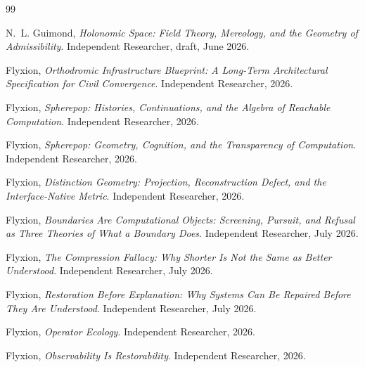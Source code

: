 \documentclass[11pt,fleqn]{book}
\numberwithin{equation}{chapter}
\theoremstyle{plain}
\theoremstyle{definition}
\theoremstyle{remark}
\begin{document}
\begin{thebibliography}{99}


N.~L. Guimond, \emph{Holonomic Space: Field Theory, Mereology, and the Geometry of Admissibility}. Independent Researcher, draft, June 2026.

Flyxion, \emph{Orthodromic Infrastructure Blueprint: A Long-Term Architectural Specification for Civil Convergence}. Independent Researcher, 2026.

Flyxion, \emph{Spherepop: Histories, Continuations, and the Algebra of Reachable Computation}. Independent Researcher, 2026.

Flyxion, \emph{Spherepop: Geometry, Cognition, and the Transparency of Computation}. Independent Researcher, 2026.

Flyxion, \emph{Distinction Geometry: Projection, Reconstruction Defect, and the Interface-Native Metric}. Independent Researcher, 2026.

Flyxion, \emph{Boundaries Are Computational Objects: Screening, Pursuit, and Refusal as Three Theories of What a Boundary Does}. Independent Researcher, July 2026.

Flyxion, \emph{The Compression Fallacy: Why Shorter Is Not the Same as Better Understood}. Independent Researcher, July 2026.

Flyxion, \emph{Restoration Before Explanation: Why Systems Can Be Repaired Before They Are Understood}. Independent Researcher, July 2026.

Flyxion, \emph{Operator Ecology}. Independent Researcher, 2026.

Flyxion, \emph{Observability Is Restorability}. Independent Researcher, 2026.



\end{thebibliography}
\end{document}
